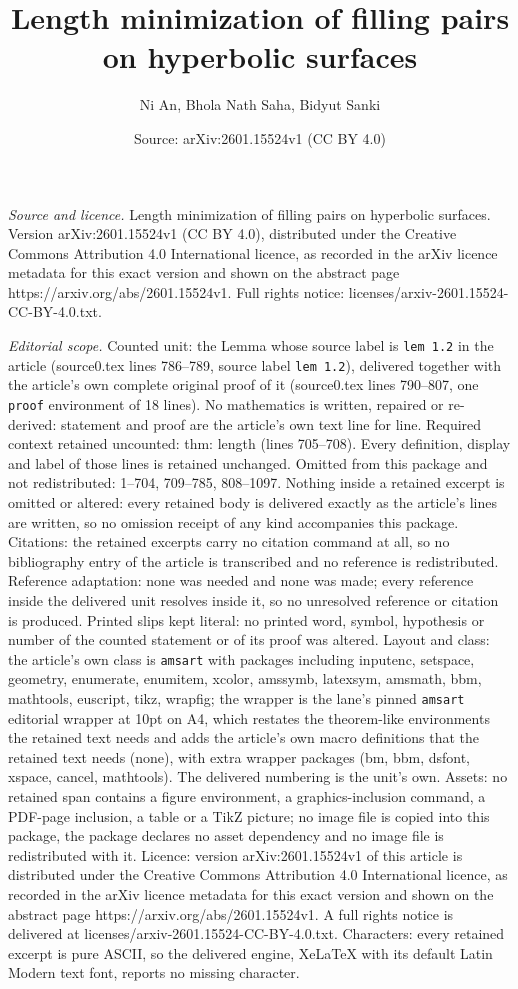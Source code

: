 \documentclass[10pt,a4paper]{amsart}
\title[Length minimization of filling pairs on hyperbolic surfaces]{Length minimization of filling pairs on hyperbolic surfaces}
\author{Ni An, Bhola Nath Saha, Bidyut Sanki}
\date{Source: arXiv:2601.15524v1 (CC BY 4.0)}
\begin{document}
\maketitle

\noindent\emph{Source and licence.} Length minimization of filling pairs on hyperbolic surfaces. Version arXiv:2601.15524v1 (CC BY 4.0), distributed under the Creative Commons Attribution 4.0 International licence, as recorded in the arXiv licence metadata for this exact version and shown on the abstract page https://arxiv.org/abs/2601.15524v1. Full rights notice: licenses/arxiv-2601.15524-CC-BY-4.0.txt.\par\smallskip

\noindent\textit{Editorial scope.} Counted unit: the Lemma whose source label is \texttt{lem 1.2} in the article (source0.tex lines 786--789, source label \texttt{lem 1.2}), delivered together with the article's own complete original proof of it (source0.tex lines 790--807, one \texttt{proof} environment of 18 lines). No mathematics is written, repaired or re-derived: statement and proof are the article's own text line for line. Required context retained uncounted: thm: length (lines 705--708). Every definition, display and label of those lines is retained unchanged. Omitted from this package and not redistributed: 1--704, 709--785, 808--1097. Nothing inside a retained excerpt is omitted or altered: every retained body is delivered exactly as the article's lines are written, so no omission receipt of any kind accompanies this package. Citations: the retained excerpts carry no citation command at all, so no bibliography entry of the article is transcribed and no reference is redistributed. Reference adaptation: none was needed and none was made; every reference inside the delivered unit resolves inside it, so no unresolved reference or citation is produced. Printed slips kept literal: no printed word, symbol, hypothesis or number of the counted statement or of its proof was altered. Layout and class: the article's own class is \texttt{amsart} with packages including inputenc, setspace, geometry, enumerate, enumitem, xcolor, amssymb, latexsym, amsmath, bbm, mathtools, euscript, tikz, wrapfig; the wrapper is the lane's pinned \texttt{amsart} editorial wrapper at 10pt on A4, which restates the theorem-like environments the retained text needs and adds the article's own macro definitions that the retained text needs (none), with extra wrapper packages (bm, bbm, dsfont, xspace, cancel, mathtools). The delivered numbering is the unit's own. Assets: no retained span contains a figure environment, a graphics-inclusion command, a PDF-page inclusion, a table or a TikZ picture; no image file is copied into this package, the package declares no asset dependency and no image file is redistributed with it. Licence: version arXiv:2601.15524v1 of this article is distributed under the Creative Commons Attribution 4.0 International licence, as recorded in the arXiv licence metadata for this exact version and shown on the abstract page https://arxiv.org/abs/2601.15524v1. A full rights notice is delivered at licenses/arxiv-2601.15524-CC-BY-4.0.txt. Characters: every retained excerpt is pure ASCII, so the delivered engine, XeLaTeX with its default Latin Modern text font, reports no missing character.
\end{document}
